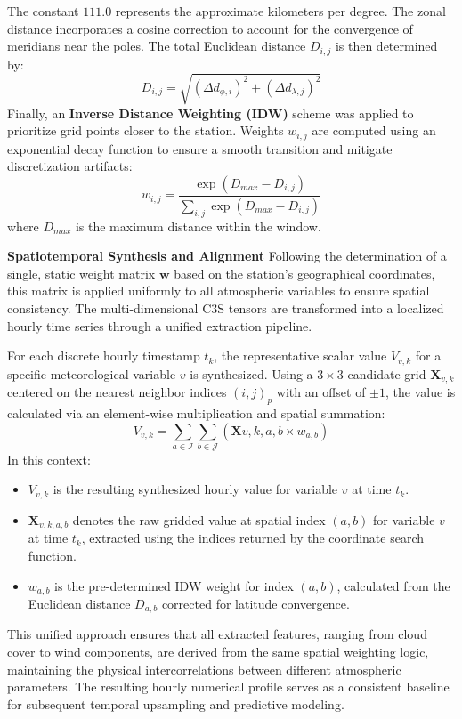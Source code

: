 \documentclass[conference]{IEEEtran}
\begin{document}
		The constant $111.0$ represents the approximate kilometers per degree. The zonal distance incorporates a cosine correction to account for the convergence of meridians near the poles. The total Euclidean distance $D_{i, j}$ is then determined by:
		\begin{equation*}
			D_{i,j} = \sqrt{(\Delta d_{\phi, i})^2 + (\Delta d_{\lambda, j})^2}
		\end{equation*}
		Finally, an \textbf{Inverse Distance Weighting (IDW)} scheme was applied to prioritize grid points closer to the station. Weights $w_{i,j}$ are computed using an exponential decay function to ensure a smooth transition and mitigate discretization artifacts:
		\begin{equation*}
			w_{i,j} = \frac{\exp(D_{max} - D_{i,j})}{\sum_{i,j} \exp(D_{max} - D_{i,j})}
		\end{equation*}
		where $D_{max}$ is the maximum distance within the window.
		
	\textbf{Spatiotemporal Synthesis and Alignment} Following the determination of a single, static weight matrix $\mathbf{w}$ based on the station's geographical coordinates, this matrix is applied uniformly to all atmospheric variables to ensure spatial consistency. The multi-dimensional C3S tensors are transformed into a localized hourly time series through a unified extraction pipeline.
		
		For each discrete hourly timestamp $t_k$, the representative scalar value $V_{v,k}$ for a specific meteorological variable $v$ is synthesized. Using a $3 \times 3$ candidate grid $\mathbf{X}_{v,k}$ centered on the nearest neighbor indices $(i, j)_p$ with an offset of $\pm 1$, the value is calculated via an element-wise multiplication and spatial summation:
		\begin{equation*} 
			V_{v,k} = \sum_{a \in \mathcal{I}} \sum_{b \in \mathcal{J}} (\mathbf{X}{v, k, a, b} \times w_{a,b}) 
		\end{equation*}
		In this context:
		\begin{itemize}
			\item $V_{v,k}$ is the resulting synthesized hourly value for variable $v$ at time $t_k$.
			\item $\mathbf{X}_{v,k,a,b}$ denotes the raw gridded value at spatial index $(a, b)$ for variable $v$ at time $t_k$, extracted using the indices returned by the coordinate search function.
			\item $w_{a,b}$ is the pre-determined IDW weight for index $(a, b)$, calculated from the Euclidean distance $D_{a,b}$ corrected for latitude convergence.
		\end{itemize}
		This unified approach ensures that all extracted features, ranging from cloud cover to wind components, are derived from the same spatial weighting logic, maintaining the physical intercorrelations between different atmospheric parameters. The resulting hourly numerical profile serves as a consistent baseline for subsequent temporal upsampling and predictive modeling.
		
\end{document}

